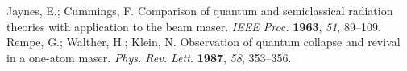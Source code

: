 \documentclass[atoms,article,accept,moreauthors,pdftex,12pt,a4paper]{mdpi}
\begin{document}
\begin{thebibliography}{----} %
Jaynes, E.; Cummings, F. Comparison of quantum and semiclassical radiation theories with application to the beam maser. {\em IEEE Proc. } {\bf 1963}, {\em 51}, 89--109.
Rempe, G.; Walther, H.; Klein, N. Observation of quantum collapse and revival in a one-atom maser. {\em Phys. Rev. Lett.} {\bf 1987}, {\em 58}, 353--356.


\end{thebibliography}
\end{document}
